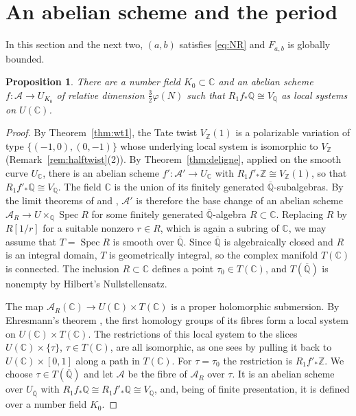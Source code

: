 \documentclass[11pt]{amsart}
\newtheorem{proposition}[theorem]{Proposition}
\theoremstyle{definition}
\theoremstyle{remark}
\numberwithin{equation}{section}
\newcommand{\Q}{\mathbb{Q}}
\newcommand{\Z}{\mathbb{Z}}
\newcommand{\C}{\mathbb{C}}
\newcommand{\Qb}{\overline{\mathbb{Q}}}
\newcommand{\cA}{\mathcal{A}}
\DeclareMathOperator{\Spec}{Spec}
\newcommand{\Fab}{F_{a,b}}
\begin{document}
\section{An abelian scheme and the period}\label{sec:abelian}

In this section and the next two, $(a,b)$ satisfies \eqref{eq:NR} and $\Fab$ is globally bounded.

\begin{proposition}\label{prop:abelian}
There are a number field $K_0\subset\C$ and an abelian scheme $f:\cA\to U_{K_0}$ of relative dimension $\frac32\varphi(N)$ such that $R_1f_*\Q\cong V_\Q$ as local systems on $U(\C)$.
\end{proposition}

\begin{proof}
By Theorem~\ref{thm:wt1}, the Tate twist $V_\Z(1)$ is a polarizable variation of type $\{(-1,0),(0,-1)\}$ whose underlying local system is isomorphic to $V_\Z$ (Remark~\ref{rem:halftwist}(2)). By Theorem~\ref{thm:deligne}, applied on the smooth curve $U_\C$, there is an abelian scheme $f':\cA'\to U_\C$ with $R_1f'_*\Z\cong V_\Z(1)$, so that $R_1f'_*\Q\cong V_\Q$. The field $\C$ is the union of its finitely generated $\Qb$-subalgebras. By the limit theorems of \citet[\S8]{EGAIV3} and \citet[\S17]{EGAIV4}, $\cA'$ is therefore the base change of an abelian scheme $\cA_R\to U\times_\Q\Spec R$ for some finitely generated $\Qb$-algebra $R\subset\C$. Replacing $R$ by $R[1/r]$ for a suitable nonzero $r\in R$, which is again a subring of $\C$, we may assume that $T=\Spec R$ is smooth over $\Qb$. Since $\Qb$ is algebraically closed and $R$ is an integral domain, $T$ is geometrically integral, so the complex manifold $T(\C)$ is connected. The inclusion $R\subset\C$ defines a point $\tau_0\in T(\C)$, and $T(\Qb)$ is nonempty by Hilbert's Nullstellensatz.

The map $\cA_R(\C)\to U(\C)\times T(\C)$ is a proper holomorphic submersion. By Ehresmann's theorem \citep{Ehresmann1950}, the first homology groups of its fibres form a local system on $U(\C)\times T(\C)$. The restrictions of this local system to the slices $U(\C)\times\{\tau\}$, $\tau\in T(\C)$, are all isomorphic, as one sees by pulling it back to $U(\C)\times[0,1]$ along a path in $T(\C)$. For $\tau=\tau_0$ the restriction is $R_1f'_*\Z$. We choose $\tau\in T(\Qb)$ and let $\cA$ be the fibre of $\cA_R$ over $\tau$. It is an abelian scheme over $U_{\Qb}$ with $R_1f_*\Q\cong R_1f'_*\Q\cong V_\Q$, and, being of finite presentation, it is defined over a number field $K_0$.
\end{proof}
\end{document}
